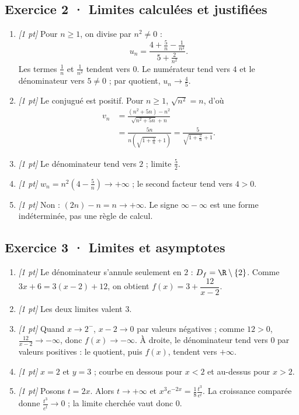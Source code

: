 \subsection*{Exercice 2 · Limites calculées et justifiées}\begin{enumerate}

\item \textit{[1 pt]} Pour $n\ge1$, on divise par $n^2\ne0$ :
\[u_n=\frac{4+\frac{5}{n}-\frac{1}{n^2}}{5+\frac{2}{n^2}}.\]
Les termes $\frac{1}{n}$ et $\frac{1}{n^2}$ tendent vers $0$. Le numérateur tend vers $4$ et le dénominateur vers $5\ne0$ ; par quotient, $u_n\to\frac{4}{5}$.

\item \textit{[1 pt]} Le conjugué est positif. Pour $n\ge1$, $\sqrt{n^2}=n$, d'où
\[\begin{aligned}v_n&=\frac{(n^2+5n)-n^2}{\sqrt{n^2+5n}+n}\\&=\frac{5n}{n(\sqrt{1+\frac{5}{n}}+1)}=\frac{5}{\sqrt{1+\frac{5}{n}}+1}.\end{aligned}\]

\item \textit{[1 pt]} Le dénominateur tend vers $2$ ; limite $\frac{5}{2}$.

\item \textit{[1 pt]} $w_n=n^2(4-\frac{5}{n})\to+\infty$ ; le second facteur tend vers $4>0$.

\item \textit{[1 pt]} Non : $(2n)-n=n\to+\infty$. Le signe $\infty-\infty$ est une forme indéterminée, pas une règle de calcul.

\end{enumerate}

\subsection*{Exercice 3 · Limites et asymptotes}\begin{enumerate}

\item \textit{[1 pt]} Le dénominateur s'annule seulement en $2$ : $D_f=\R\setminus\{2\}$. Comme $3x+6=3(x-2)+12$, on obtient $f(x)=3+\dfrac{12}{x-2}$.

\item \textit{[1 pt]} Les deux limites valent $3$.

\item \textit{[1 pt]} Quand $x\to 2^-$, $x-2\to0$ par valeurs négatives ; comme $12>0$, $\frac{12}{x-2}\to-\infty$, donc $f(x)\to-\infty$. À droite, le dénominateur tend vers $0$ par valeurs positives : le quotient, puis $f(x)$, tendent vers $+\infty$.

\item \textit{[1 pt]} $x=2$ et $y=3$ ; courbe en dessous pour $x<2$ et au-dessus pour $x>2$.

\item \textit{[1 pt]} Posons $t=2x$. Alors $t\to+\infty$ et $x^3e^{-2x}=\frac{1}{8}\frac{t^3}{e^t}$. La croissance comparée donne $\frac{t^3}{e^t}\to0$ ; la limite cherchée vaut donc $0$.

\end{enumerate}

